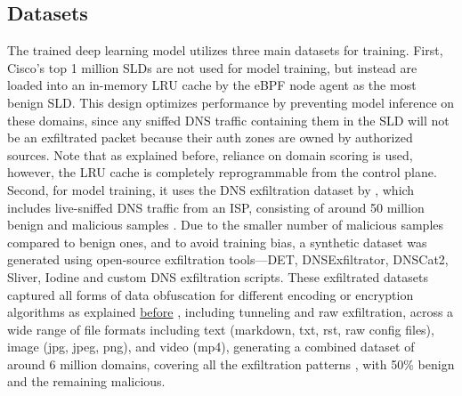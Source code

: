 \documentclass [11pt, proquest] {uwthesis}[2020/02/24]
\begin{document}
\subsection{Datasets}
\label{sec:dataset}
The trained deep learning model utilizes three main datasets for training. First, Cisco’s top 1 million SLDs are not used for model training, but instead are loaded into an in-memory LRU cache by the eBPF node agent as the most benign SLD. This design optimizes performance by preventing model inference on these domains, since any sniffed DNS traffic containing them in the SLD will not be an exfiltrated packet because their auth zones are owned by authorized sources. Note that as explained before, reliance on domain scoring is used, however, the LRU cache is completely reprogrammable from the control plane. Second, for model training, it uses the DNS exfiltration dataset by \citeauthor{ziza2023dns}, which includes live-sniffed DNS traffic from an ISP, consisting of around 50 million benign and malicious samples \cite{ziza2023dns}. Due to the smaller number of malicious samples compared to benign ones, and to avoid training bias, a synthetic dataset was generated using open-source exfiltration tools—DET, DNSExfiltrator, DNSCat2, Sliver, Iodine and custom DNS exfiltration scripts. These exfiltrated datasets captured all forms of data obfuscation for different encoding or encryption algorithms as explained  \hyperref[dns_payload_obfuscation]{before} , including tunneling and raw exfiltration, across a wide range of file formats including text (markdown, txt, rst, raw config files), image (jpg, jpeg, png), and video (mp4), generating a combined dataset of around 6 million domains, covering all the exfiltration patterns , with 50\% benign and the remaining malicious.


\begin{table}[ht]
\centering
{}
\caption{DNS Features in Kernel}
\label{sec:feature-kernel}
\end{table}
\end{document}
